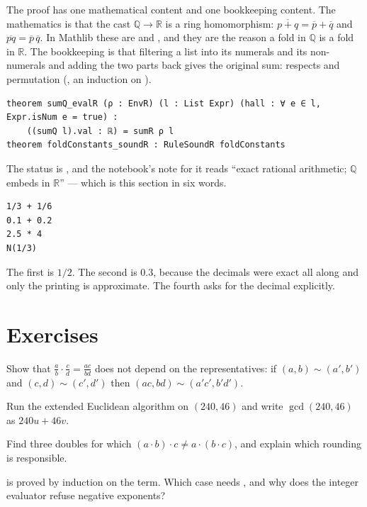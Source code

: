 The proof has one mathematical content and one bookkeeping content. The mathematics is that the
cast $\mathbb{Q} \to \mathbb{R}$ is a ring homomorphism: $\overline{p + q} = \overline p +
\overline q$ and $\overline{pq} = \overline p \, \overline q$. In Mathlib these are
 and , and they are the reason a fold in $\mathbb{Q}$ is a
fold in $\mathbb{R}$. The bookkeeping is that filtering a list into its numerals and its
non-numerals and adding the two parts back gives the original sum:  respects
 and permutation (, an induction on ).

\begin{verbatim}
theorem sumQ_evalR (ρ : EnvR) (l : List Expr) (hall : ∀ e ∈ l, Expr.isNum e = true) :
    ((sumQ l).val : ℝ) = sumR ρ l
theorem foldConstants_soundR : RuleSoundR foldConstants
\end{verbatim}

The status is , and the notebook's note for it reads ``exact rational arithmetic;
$\mathbb{Q}$ embeds in $\mathbb{R}$'' --- which is this section in six words.

\begin{trybox}
\begin{verbatim}
1/3 + 1/6
0.1 + 0.2
2.5 * 4
N(1/3)
\end{verbatim}
  The first is $1/2$. The second is $0.3$, because the decimals were exact all along and only
  the printing is approximate. The fourth asks for the decimal explicitly.
\end{trybox}

\section{Exercises}

\begin{exercisebox}
  Show that $\frac{a}{b} \cdot \frac{c}{d} = \frac{ac}{bd}$ does not depend on the representatives:
  if $(a,b) \sim (a',b')$ and $(c,d) \sim (c',d')$ then $(ac, bd) \sim (a'c', b'd')$.
\end{exercisebox}

\begin{exercisebox}
  Run the extended Euclidean algorithm on $(240, 46)$ and write $\gcd(240, 46)$ as
  $240u + 46v$.
\end{exercisebox}

\begin{exercisebox}
  Find three doubles for which $(a \cdot b) \cdot c \neq a \cdot (b \cdot c)$, and explain which
  rounding is responsible.
\end{exercisebox}

\begin{exercisebox}
   is proved by induction on the term. Which case needs
  , and why does the integer evaluator refuse negative exponents?
\end{exercisebox}
